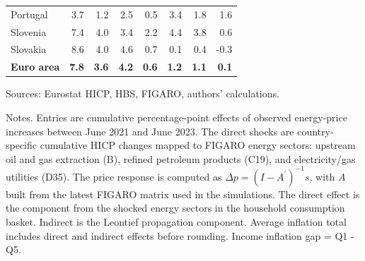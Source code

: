 \documentclass[11pt]{article}
\begin{document}
\begin{table}[H]
\begin{tabular}{lrrrrrrr}
Portugal & 3.7 & 1.2 & 2.5 & 0.5 & 3.4 & 1.8 & 1.6
 \\
Slovenia & 7.4 & 4.0 & 3.4 & 2.2 & 4.4 & 3.8 & 0.6
 \\
Slovakia & 8.6 & 4.0 & 4.6 & 0.7 & 0.1 & 0.4 & -0.3
 \\
\midrule
\textbf{Euro area} & \textbf{7.8} & \textbf{3.6} & \textbf{4.2} & \textbf{0.6} & \textbf{1.2} & \textbf{1.1} & \textbf{0.1}
 \\
\bottomrule
\end{tabular}
\par\vspace{0.35em}\footnotesize\noindent Sources: Eurostat HICP, HBS, FIGARO, authors' calculations.
\par\vspace{0.25em}\footnotesize\noindent Notes. Entries are cumulative percentage-point effects of observed energy-price increases between June 2021 and June 2023. The direct shocks are country-specific cumulative HICP changes mapped to FIGARO energy sectors: upstream oil and gas extraction (B), refined petroleum products (C19), and electricity/gas utilities (D35). The price response is computed as $\Delta p = (I - A^{\prime})^{-1}s$, with $A$ built from the latest FIGARO matrix used in the simulations. The direct effect is the component from the shocked energy sectors in the household consumption basket. Indirect is the Leontief propagation component. Average inflation total includes direct and indirect effects before rounding. Income inflation gap = Q1 - Q5.
\end{table}
\vspace{0.6em}
\end{document}
